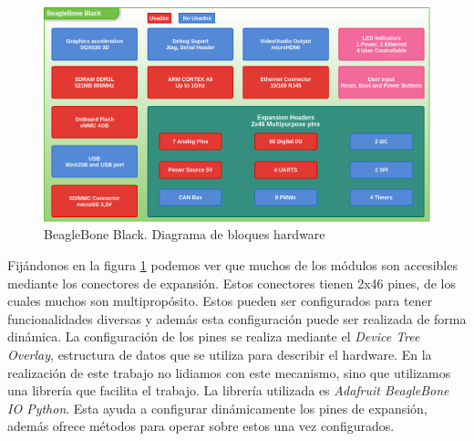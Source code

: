 	\begin{figure}[h]
		\centering
		\includegraphics[keepaspectratio, width=1\textwidth]{./img/beaglebone.png}
		\caption{BeagleBone Black. Diagrama de bloques hardware}
		\label{fig:beaglebone}
	\end{figure}
	\par
	Fijándonos en la figura \ref{fig:beaglebone} podemos ver que muchos de los módulos son accesibles mediante los conectores de
	expansión\cite{BeagleWikiExp}. Estos conectores tienen 2x46 pines, de los cuales muchos son multipropósito. Estos pueden ser configurados para tener
	funcionalidades diversas y además esta configuración puede ser realizada de forma dinámica. La configuración de los pines se realiza mediante
	el \emph{Device Tree Overlay}, estructura de datos que se utiliza para describir el hardware. En la realización de este trabajo no lidiamos
	con este mecanismo, sino que utilizamos una librería que facilita el trabajo. La librería utilizada es \emph{Adafruit BeagleBone IO
	Python}\cite{AdaFruitGit}. Esta ayuda a configurar dinámicamente los pines de expansión, además ofrece métodos para
	operar sobre estos una vez configurados.


